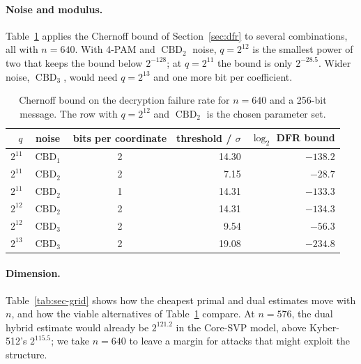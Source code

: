 \documentclass[11pt,a4paper]{article}
\theoremstyle{definition}
\newcommand{\CBD}{\operatorname{CBD}}
\begin{document}
\paragraph{Noise and modulus.} Table~\ref{tab:dfr-grid} applies the Chernoff bound of Section~\ref{sec:dfr} to several combinations, all with $n = 640$. With 4-PAM and $\CBD_2$ noise, $q = 2^{12}$ is the smallest power of two that keeps the bound below $2^{-128}$; at $q = 2^{11}$ the bound is only $2^{-28.5}$. Wider noise, $\CBD_3$, would need $q = 2^{13}$ and one more bit per coefficient.

\begin{table}[H]
\centering
\small
\begin{tabular}{rcc rr}
\toprule
$q$ & noise & bits per coordinate & threshold / $\sigma$ & $\log_2$ DFR bound \\
\midrule
$2^{11}$ & $\CBD_1$ & 2 & 14.30 & $-138.2$ \\
$2^{11}$ & $\CBD_2$ & 2 & 7.15 & $-28.7$ \\
$2^{11}$ & $\CBD_2$ & 1 & 14.31 & $-133.3$ \\
$2^{12}$ & $\CBD_2$ & 2 & 14.31 & $-134.3$ \\
$2^{12}$ & $\CBD_3$ & 2 & 9.54 & $-56.3$ \\
$2^{13}$ & $\CBD_3$ & 2 & 19.08 & $-234.8$ \\
\bottomrule
\end{tabular}
\caption{Chernoff bound on the decryption failure rate for $n = 640$ and a 256-bit message. The row with $q = 2^{12}$ and $\CBD_2$ is the chosen parameter set.}
\label{tab:dfr-grid}
\end{table}

\paragraph{Dimension.} Table~\ref{tab:sec-grid} shows how the cheapest primal and dual estimates move with $n$, and how the viable alternatives of Table~\ref{tab:dfr-grid} compare. At $n = 576$, the dual hybrid estimate would already be $2^{121.2}$ in the Core-SVP model, above Kyber-512's $2^{115.5}$; we take $n = 640$ to leave a margin for attacks that might exploit the structure.
\end{document}
